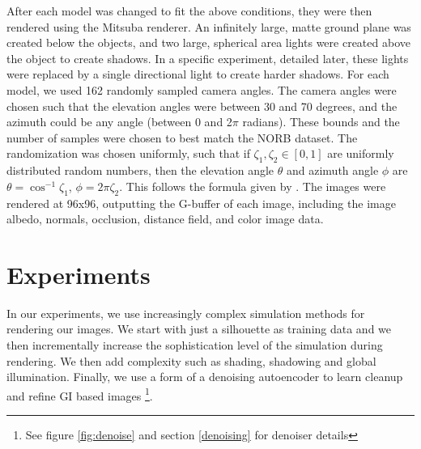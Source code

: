 \documentclass[10pt,twocolumn,letterpaper]{article}
\begin{document}

After each model was changed to fit the above conditions, they were then rendered using the Mitsuba renderer. An infinitely large, matte ground plane was created below the objects, and two large, spherical area lights were created above the object to create shadows. In a specific experiment, detailed later, these lights were replaced by a single directional light to create harder shadows. For each model, we used 162 randomly sampled camera angles. The camera angles were chosen such that the elevation angles were between 30 and 70 degrees, and the azimuth could be any angle (between 0 and 2$\pi$ radians). These bounds and the number of samples were chosen to best match the NORB dataset. The randomization was chosen uniformly, such that if $\zeta_1,\zeta_2\in[0,1]$ are uniformly distributed random numbers, then the elevation angle $\theta$ and azimuth angle $\phi$ are $\theta = \cos^{-1}\zeta_1$, $\phi = 2\pi \zeta_2$. This follows the formula given by \cite{Pharr:2010:PBR:1854996}. The images were rendered at 96x96, outputting the G-buffer of each image, including the image albedo, normals, occlusion, distance field, and color image data.

\section{Experiments}
In our experiments, we use increasingly complex simulation methods for rendering our images.  We start with just a silhouette as training data and we then incrementally increase the sophistication level of the simulation during rendering.  We then add complexity such as shading, shadowing and global illumination. Finally, we use a form of a denoising autoencoder to learn cleanup and refine GI based images \footnote{See figure \ref{fig:denoise} and section \ref{denoising} for denoiser details}.
\end{document}
